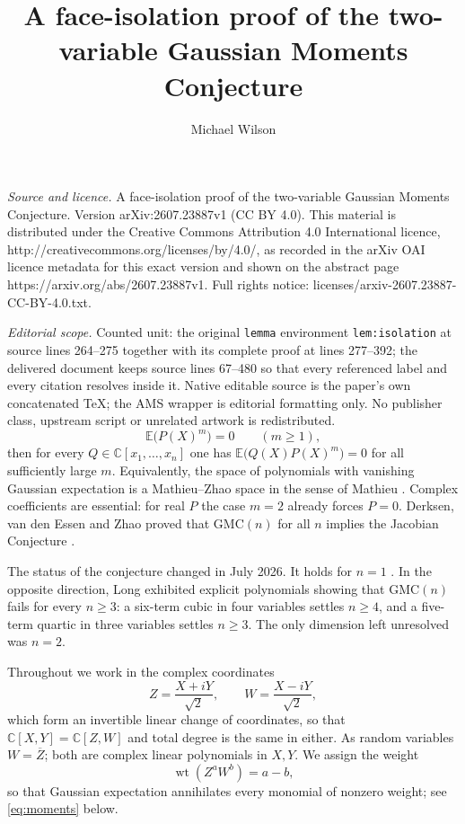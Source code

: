\documentclass[10pt,a4paper]{amsart}
\numberwithin{equation}{section}
\DeclareMathOperator{\wt}{wt}
\newcommand{\C}{\mathbb{C}}
\newcommand{\E}{\mathbb{E}}
\newcommand{\GMC}{\mathrm{GMC}}
\begin{document}
\title[A face-isolation proof of the two-variable Gaussian Moments ]{A face-isolation proof of the two-variable Gaussian Moments Conjecture}
\author{Michael Wilson}
\date{}
\maketitle
\noindent\emph{Source and licence.} A face-isolation proof of the two-variable Gaussian Moments Conjecture. Version arXiv:2607.23887v1 (CC BY 4.0). This material is distributed under the Creative Commons Attribution 4.0 International licence, http://creativecommons.org/licenses/by/4.0/, as recorded in the arXiv OAI licence metadata for this exact version and shown on the abstract page https://arxiv.org/abs/2607.23887v1. Full rights notice: licenses/arxiv-2607.23887-CC-BY-4.0.txt.\par\smallskip
\noindent\textit{Editorial scope.} Counted unit: the original \texttt{lemma} environment \texttt{lem:isolation} at source lines 264--275 together with its complete proof at lines 277--392; the delivered document keeps source lines 67--480 so that every referenced label and every citation resolves inside it. Native editable source is the paper's own concatenated TeX; the AMS wrapper is editorial formatting only. No publisher class, upstream script or unrelated artwork is redistributed.
\begin{equation}\label{eq:hyp}
  \E\bigl(P(X)^m\bigr)=0 \qquad (m\ge1),
\end{equation}
then for every $Q\in\C[x_1,\dots,x_n]$ one has $\E\bigl(Q(X)P(X)^m\bigr)=0$ for
all sufficiently large $m$. Equivalently, the space of polynomials with
vanishing Gaussian expectation is a Mathieu--Zhao space in the sense of Mathieu
\cite{Mathieu}. Complex coefficients are essential: for real $P$ the case $m=2$
already forces $P=0$. Derksen, van den Essen and Zhao proved that $\GMC(n)$ for
all $n$ implies the Jacobian Conjecture \cite[Thm.~1.6]{DvdEZ}.

The status of the conjecture changed in July 2026. It holds for $n=1$
\cite[Prop.~4.2]{DvdEZ}. In the opposite direction, Long \cite{Long} exhibited
explicit polynomials showing that $\GMC(n)$ fails for every $n\ge3$: a six-term
cubic in four variables settles $n\ge4$, and a five-term quartic in three
variables settles $n\ge3$. The only dimension left unresolved was $n=2$.

Throughout we work in the complex coordinates
\begin{equation}\label{eq:coords}
  Z=\frac{X+iY}{\sqrt2},\qquad W=\frac{X-iY}{\sqrt2},
\end{equation}
which form an invertible linear change of coordinates, so that
$\C[X,Y]=\C[Z,W]$ and total degree is the same in either. As random variables
$W=\overline{Z}$; both are complex linear polynomials in $X,Y$. We assign the
weight
\[
  \wt(Z^aW^b)=a-b,
\]
so that Gaussian expectation annihilates every monomial of nonzero weight; see
\eqref{eq:moments} below.
\end{document}
